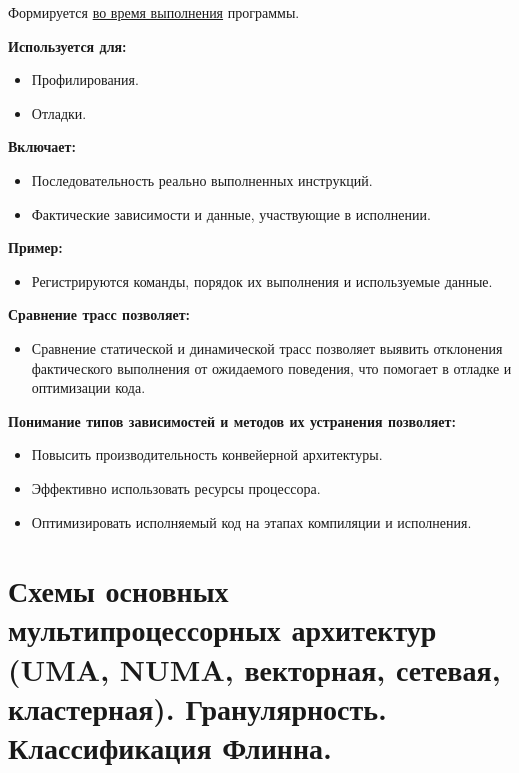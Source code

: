 	Формируется \uline{во время выполнения} программы.
	
	\textbf{Используется для:}
	
	\begin{itemize}
		\item Профилирования.
		\item Отладки.
	\end{itemize}
	
	\textbf{Включает:}
	\begin{itemize}
		\item Последовательность реально выполненных инструкций.
		\item Фактические зависимости и данные, участвующие в исполнении.
	\end{itemize}
	
	\textbf{Пример:}
	\begin{itemize}
		\item Регистрируются команды, порядок их выполнения и используемые данные.
	\end{itemize}
	
	\textbf{Сравнение трасс позволяет:}
	\begin{itemize}
		\item Сравнение статической и динамической трасс позволяет выявить отклонения фактического выполнения от ожидаемого поведения, что помогает в отладке и оптимизации кода.
	\end{itemize}
	
	\textbf{Понимание типов зависимостей и методов их устранения позволяет:}
	\begin{itemize}
		\item Повысить производительность конвейерной архитектуры.
		\item Эффективно использовать ресурсы процессора.
		\item Оптимизировать исполняемый код на этапах компиляции и исполнения.
	\end{itemize}
	
	\newpage
	
	\section{Схемы основных мультипроцессорных архитектур (UMA, NUMA, векторная, сетевая, кластерная). Гранулярность. Классификация Флинна.}
	
